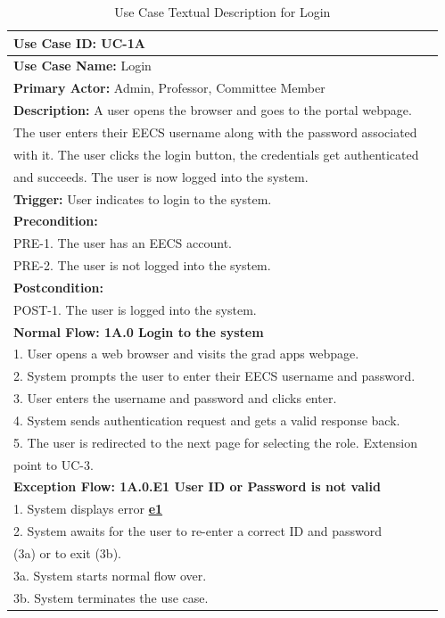 \documentclass[fontsize=12pt,paper=letter,twoside]{scrartcl}
\begin{document}
\begin{table}[!htb]
\begin{center}
\begin{tabular}{|l|l|}
\hline
\textbf{Use Case ID:} UC-1A \\ \hline
\textbf{Use Case Name:} Login \\ \hline
\textbf {Primary Actor:} Admin, Professor, Committee Member\\ \hline
\textbf{Description:} A user opens the browser and goes to the portal webpage. \\The user enters their EECS username along with the password associated \\with it. The user clicks the login button, the credentials get authenticated \\and succeeds. The user is now logged into the system. \\ \hline
\textbf{Trigger:} User indicates to login to the system.\\ \hline
\textbf{Precondition:}
\\ PRE-1. The user has an EECS account. 
\\ PRE-2. The user is not logged into the system. \\ \hline
\textbf{Postcondition:}
\\ POST-1. The user is logged into the system. \\ \hline
\textbf{Normal Flow: 1A.0 Login to the system}
\\ 1. User opens a web browser and visits the grad apps webpage.
\\ 2. System prompts the user to enter their EECS username and password.
\\ 3. User enters the username and password and clicks enter.
\\ 4. System sends authentication request and gets a valid response back.
\\ 5. The user is redirected to the next page for selecting the role. Extension \\point to UC-3.\\ \hline
\textbf{Exception Flow: 1A.0.E1 User ID or Password is not valid}
\\ 1. System displays error \hyperref[app:error]{\textbf{e1}}
\\ 2. System awaits for the user to re-enter a correct ID and password \\(3a) or to exit (3b).
\\ 3a. System starts normal flow over.
\\ 3b. System terminates the use case.\\ \hline
\end{tabular}
\end{center}
\caption {Use Case Textual Description for Login}
\label{tbl:uc1Atd}
\end{table}
\end{document}
